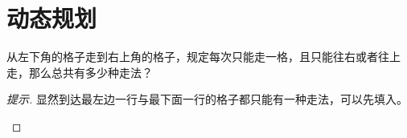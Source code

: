 
\section{动态规划}
\label{sec:dynamic-programming}

\begin{example}
  从左下角的格子走到右上角的格子，规定每次只能走一格，且只能往右或者往上走，那么总共有多少种走法？
  \begin{center}
  \end{center}
\end{example}
\begin{proof}[提示]
  显然到达最左边一行与最下面一行的格子都只能有一种走法，可以先填入。
  \begin{center}
  \end{center}


\end{proof}

